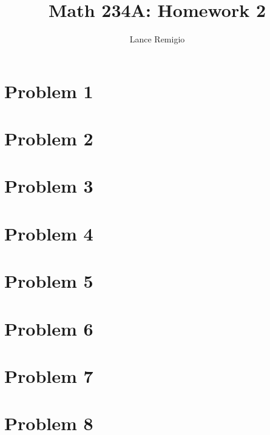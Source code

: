 \documentclass[a4paper]{article}
\title{Math 234A: Homework 2}
\author{Lance Remigio}
\begin{document}
   \maketitle 
 
\section{Problem 1} 



\section{Problem 2}



\section{Problem 3}

\section{Problem 4}

\section{Problem 5}

\section{Problem 6}

\section{Problem 7}

\section{Problem 8}
\end{document}
